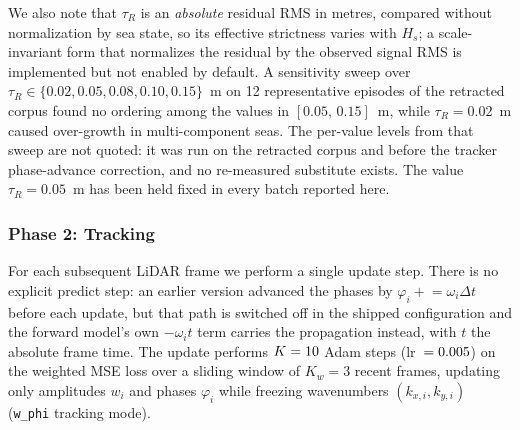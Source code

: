 \documentclass[review]{elsarticle}
\begin{document}
We also note that $\tau_R$ is an \emph{absolute} residual RMS in metres,
compared without normalization by sea state, so its effective strictness
varies with $H_s$; a scale-invariant form that normalizes the residual by
the observed signal RMS is implemented but not enabled by default.
A sensitivity sweep over $\tau_R \in \{0.02, 0.05, 0.08, 0.10, 0.15\}$~m
on 12 representative episodes of the retracted corpus found no ordering among the
values in $[0.05,\,0.15]$~m, while $\tau_R = 0.02$~m caused over-growth in
multi-component seas. The per-value levels
from that sweep are not quoted: it was run on the retracted corpus and before the
tracker phase-advance correction, and no re-measured substitute exists. %
The value
$\tau_R = 0.05$~m has been held fixed in every batch reported here.


\subsubsection{Phase 2: Tracking}

For each subsequent LiDAR frame we perform a single update step. There is no
explicit predict step: an earlier version advanced the phases by
$\varphi_i \mathrel{+}= \omega_i \Delta t$ before each update, but that path is
switched off in the shipped configuration and the forward model's own
$-\omega_i t$ term carries the propagation instead, with $t$ the absolute frame
time. The update performs $K=10{}$ Adam steps
(lr~$=0.005{}$) on the weighted MSE loss over a sliding window of
$K_w=3$ recent frames, updating only amplitudes $w_i$ and phases $\varphi_i$ while
freezing wavenumbers $(k_{x,i}, k_{y,i})$ (\texttt{w\_phi} tracking mode).
\end{document}
